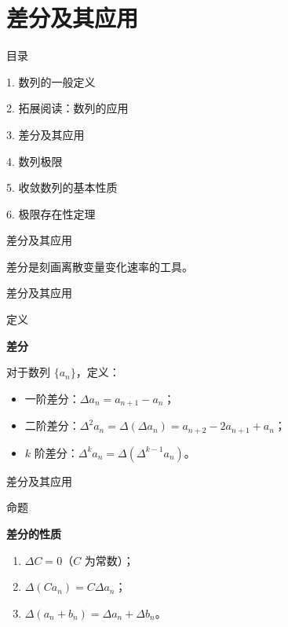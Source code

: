 \documentclass[aspectratio=169,10pt,fontset=fandol]{ctexbeamer}
\begin{document}
\section{差分及其应用}
\begin{frame}[t,fragile]{目录}
\normalsize
{\color{black}\normalsize 1. 数列的一般定义\par}\vspace{0.3em}
{\color{black}\normalsize 2. 拓展阅读：数列的应用\par}\vspace{0.3em}
{\color{blue}\normalsize 3. 差分及其应用\par}\vspace{0.3em}
{\color{gray!40}\normalsize 4. 数列极限\par}\vspace{0.3em}
{\color{gray!40}\normalsize 5. 收敛数列的基本性质\par}\vspace{0.3em}
{\color{gray!40}\normalsize 6. 极限存在性定理\par}\vspace{0.3em}
\end{frame}
\begin{frame}[t,fragile]{差分及其应用}
\footnotesize
{\footnotesize
差分是刻画离散变量变化速率的工具。


}
\end{frame}
\begin{frame}[t,fragile]{差分及其应用}
\footnotesize
\begin{block}{定义}
{\footnotesize
\textbf{差分}\par

对于数列 \(\{a_n\}\)，定义：
\begin{itemize}
\item 一阶差分：\(\Delta a_n = a_{n+1} - a_n\)；
\item 二阶差分：\(\Delta^2 a_n = \Delta(\Delta a_n) = a_{n+2} - 2a_{n+1} + a_n\)；
\item \(k\) 阶差分：\(\Delta^k a_n = \Delta(\Delta^{k-1} a_n)\)。
\end{itemize}

}
\end{block}
\end{frame}
\begin{frame}[t,fragile]{差分及其应用}
\footnotesize
\begin{block}{命题}
{\footnotesize
\textbf{差分的性质}\par

\begin{enumerate}
\item \(\Delta C = 0\)（\(C\) 为常数）；
\item \(\Delta(C a_n) = C \Delta a_n\)；
\item \(\Delta(a_n + b_n) = \Delta a_n + \Delta b_n\)。
\end{enumerate}

}
\end{block}
\end{frame}
\end{document}
